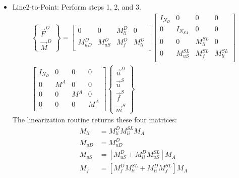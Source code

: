 \documentclass[10pt,letterpaper,oneside,notitlepage]{article}
\begin{document}
\begin{itemize}
   
  \item Line2-to-Point: Perform steps 1, 2, and 3.
         \begin{multline}
            \left\{   \begin{matrix} \vec{F}^{D} \\ \vec{M}^{D} \end{matrix} \right\} 
           =
           \begin{bmatrix}
            0                    & 0                      & M_{li}^{D}  & 0            \\
            M_{uD}^{D}           & M_{uS}^{D}             & M_{f}^{D}   & M_{li}^{D}   \\
            \end{bmatrix}            
            \begin{bmatrix}
            I_{N_D}              & 0                     & 0            & 0            \\
            0                    & I_{\mathit{N_{SA}}}   & 0            & 0            \\
            0                    & 0                     & M_{li}^{SL}  & 0            \\
            0                    & M_{uS}^{SL}           & M_{f}^{SL}   & M_{li}^{SL}  \\
            \end{bmatrix}
            \\            
            \begin{bmatrix}
            I_{\mathit{N_D}}     & 0      & 0      & 0   \\
            0                    & M^A    & 0      & 0   \\
            0                    & 0      & M^A    & 0   \\
            0                    & 0      & 0      & M^A \\
            \end{bmatrix}
            \left\{   \begin{matrix} \vec{u}^D \\ \vec{u}^{S}  \\ \vec{f}^{S}  \\ \vec{m}^{S} \end{matrix} \right\}             
         \end{multline}               
      The linearization routine returns these four matrices:
   \begin{align}
    M_{li} &= M_{li}^D M_{li}^{SL} M_{A} \\ 
    M_{uD} &= M_{uD}^D \\ 
    M_{uS} &= \left[ M_{uS}^D + M_{li}^{D} M_{uS}^{SL}\right]M_{A} \\ 
    M_{f}  &= \left[ M_{f}^D M_{li}^{SL} + M_{li}^{D} M_{f}^{SL} \right]M_{A}  \end{align} 
   

\end{itemize}
\end{document}
